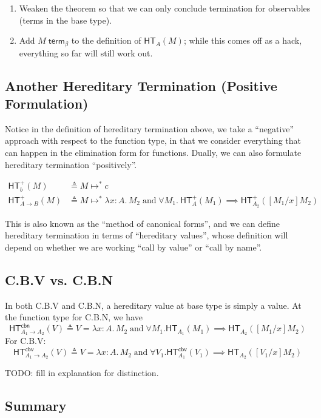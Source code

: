 \documentclass{article}
\newcommand{\hterm}[2]{\ensuremath{\mathsf{HT}_{#1}(#2)}}
\newcommand{\htermp}[2]{\ensuremath{\mathsf{HT}^+_{#1}(#2)}}
\newcommand{\termb}[1]{\ensuremath{{#1} \; \mathsf{term}_{\beta}}}
\newcommand{\hcbn}[2]{\ensuremath{\mathsf{HT}^{\mathsf{cbn}}_{#1}(#2)}}
\newcommand{\hcbv}[2]{\ensuremath{\mathsf{HT}^{\mathsf{cbv}}_{#1}(#2)}}
\newcommand{\steps}[2]{\ensuremath{#1 \mapsto^* #2}}
\newcommand{\fn}[2]{\ensuremath{#1 \to #2}}
\newcommand{\lam}[3]{\ensuremath{\lambda #1 {:} #2.\, #3}}
\begin{document}
\begin{enumerate}
\item Weaken the theorem so that we can only conclude termination for observables (terms in the base type).
\item Add $\termb{M}$ to the definition of $\hterm{A}{M}$; while this comes off as a hack, everything so far will 
still work out.
\end{enumerate}

\subsection{Another Hereditary Termination (Positive Formulation)}

Notice in the definition of hereditary termination above, we take a ``negative'' approach with respect to the 
function type, in that we consider everything that can happen in the elimination form for functions. Dually, we can 
also formulate hereditary termination ``positively''. 

\begin{align*}
  \htermp{b}{M} &\triangleq \steps{M}{c}\\
  \htermp{\fn{A}{B}}{M} &\triangleq \steps{M}{\lam{x}{A}{M_2}} \; \text{and}\;
  \forall M_1.\ \htermp{A}{M_1} \implies \htermp{A_2}{[M_1/x]M_2}
\end{align*}

This is also known as the ``method of canonical forms'', and we can define hereditary termination in terms of 
``hereditary values'', whose definition will depend on whether we are working ``call by value'' or ``call by name''. 

\subsection{C.B.V vs. C.B.N}

In both C.B.V and C.B.N, a hereditary value at base type is simply a value. 
At the function type for C.B.N, we have
\[
\hcbn{\fn{A_1}{A_2}}{V} \triangleq V = \lam{x}{A}{M_2} \; \text{and} \; \forall M_1. \hterm{A_1}{M_1} \implies
\hterm{A_2}{[M_1/x]M_2}
\]
For C.B.V:
\[
\hcbv{\fn{A_1}{A_2}}{V} \triangleq V = \lam{x}{A}{M_2} \; \text{and} \; \forall V_1. \hcbv{A_1}{V_1} \implies
\hterm{A_2}{[V_1/x]M_2}
\]

TODO: fill in explanation for distinction. 

\subsection{Summary}
\end{document}

